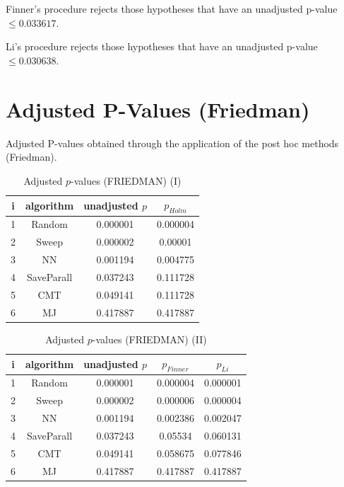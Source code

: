 \documentclass[a4paper,10pt]{article}
\begin{document}
\begin{landscape}
Finner's procedure rejects those hypotheses that have an unadjusted p-value $\le0.033617$.

Li's procedure rejects those hypotheses that have an unadjusted p-value $\le0.030638$.


\newpage

\section{Adjusted P-Values (Friedman)}


Adjusted P-values obtained through the application of the post hoc methods (Friedman).

\begin{table}[!htp]
\centering\small
\begin{tabular}{cccc}
i&algorithm&unadjusted $p$&$p_{Holm}$\\
\hline1&Random&0.000001&0.000004\\2&Sweep&0.000002&0.00001\\3&NN&0.001194&0.004775\\4&SaveParall&0.037243&0.111728\\5&CMT&0.049141&0.111728\\6&MJ&0.417887&0.417887\\\hline
\end{tabular}
\caption{Adjusted $p$-values (FRIEDMAN) (I)}
\end{table}
\begin{table}[!htp]
\centering\small
\begin{tabular}{ccccc}
i&algorithm&unadjusted $p$&$p_{Finner}$&$p_{Li}$\\
\hline1&Random&0.000001&0.000004&0.000001\\2&Sweep&0.000002&0.000006&0.000004\\3&NN&0.001194&0.002386&0.002047\\4&SaveParall&0.037243&0.05534&0.060131\\5&CMT&0.049141&0.058675&0.077846\\6&MJ&0.417887&0.417887&0.417887\\\hline
\end{tabular}
\caption{Adjusted $p$-values (FRIEDMAN) (II)}
\end{table}

\newpage
\end{landscape}
\end{document}

